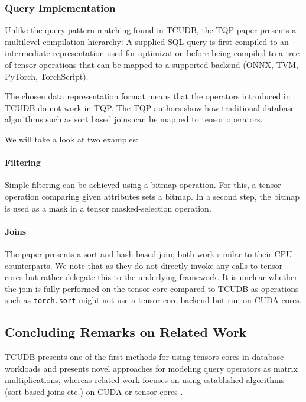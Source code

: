\documentclass{paper}
\begin{document}
	\subsubsection{Query Implementation}
	
	Unlike the query pattern matching found in TCUDB, the TQP paper presents a multilevel compilation hierarchy: A supplied SQL query is first compiled to an intermediate representation used for optimization before being compiled to a tree of tensor operations that can be mapped to a supported backend (ONNX, TVM, PyTorch, TorchScript).
	
	The chosen data representation format means that the operators introduced in TCUDB do not work in TQP. The TQP authors show how traditional database algorithms such as sort based joins can be mapped to tensor operators. 
	
	We will take a look at two examples:
	
	\paragraph{Filtering}	Simple filtering can be achieved using a \allowbreak bitmap operation. For this, a tensor operation comparing given attributes sets a bitmap. In a second step, the bitmap is used as a mask in a tensor masked-selection operation. 
	
	\paragraph{Joins}
	
	The paper presents a sort and hash based join; both work similar to their CPU counterparts. We note that as they do not directly invoke any calls to tensor cores but rather delegate this to the underlying framework. It is unclear whether the join is fully performed on the tensor core compared to TCUDB as operations such as \texttt{torch.sort} might not use a tensor core backend but run on CUDA cores.
	
	\subsection{Concluding Remarks on Related Work}
	
	TCUDB presents one of the first methods for using tensors cores in database workloads and presents \allowbreak novel approaches for modeling query operators as matrix multiplications, whereas related work focuses on using established algorithms (sort-based joins etc.) on CUDA \cite{yuan2013yin} or tensor cores \cite{he2022query}.
	
\end{document}
